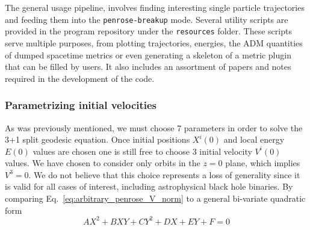 %
The general usage pipeline, involves finding interesting single particle trajectories and feeding them into the \texttt{penrose-breakup} mode. Several utility scripts are provided in the program repository under the \texttt{resources} folder. These scripts serve multiple purposes, from plotting trajectories, energies, the ADM quantities of dumped spacetime metrics or even generating a skeleton of a metric plugin that can be filled by users. It also includes an assortment of papers and notes required in the development of the code.

\subsubsection{Parametrizing initial velocities}

As was previously mentioned, we must choose 7 parameters in order to solve the 3+1 split geodesic equation. Once initial positions $X^i(0)$ and local energy $E(0)$ values are chosen one is still free to choose 3 initial velocity $V^i(0)$ values. We have chosen to consider only orbits in the $z=0$ plane, which implies $V^3=0$. We do not believe that this choice represents a loss of generality since it is valid for all cases of interest, including astrophysical black hole binaries. By comparing Eq.~\eqref{eq:arbitrary_penrose_V_norm} to a general bi-variate quadratic form
%
\begin{equation}
  A X^2 + B X Y + C Y^2 + D X + E Y + F = 0
  \label{eq:arbitrary_penrose_}
\end{equation}
%